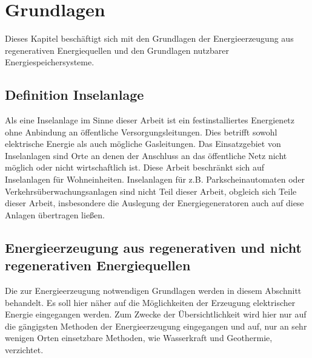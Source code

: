 \chapter{Grundlagen}
  Dieses Kapitel beschäftigt sich mit den Grundlagen der Energieerzeugung aus regenerativen Energiequellen und den Grundlagen nutzbarer Energiespeichersysteme.

  \section{Definition Inselanlage}
    Als eine Inselanlage im Sinne dieser Arbeit ist ein festinstalliertes Energienetz ohne Anbindung an öffentliche Versorgungsleitungen.
    Dies betrifft sowohl elektrische Energie als auch mögliche Gasleitungen.
    Das Einsatzgebiet von Inselanlagen sind Orte an denen der Anschluss an das öffentliche Netz nicht möglich oder nicht wirtschaftlich ist.
    Diese Arbeit beschränkt sich auf Inselanlagen für Wohneinheiten. Inselanlagen für z.B. Parkscheinautomaten oder Verkehrsüberwachungsanlagen sind nicht Teil dieser Arbeit, obgleich sich Teile dieser Arbeit, insbesondere die Auslegung der Energiegeneratoren auch auf diese Anlagen übertragen ließen.

  \section{Energieerzeugung aus regenerativen und nicht regenerativen Energiequellen}
    Die zur Energieerzeugung notwendigen Grundlagen werden in diesem Abschnitt behandelt.
    Es soll hier näher auf die Möglichkeiten der Erzeugung elektrischer Energie eingegangen werden.
    Zum Zwecke der Übersichtlichkeit wird hier nur auf die gängigsten Methoden der Energieerzeugung eingegangen und auf, nur an sehr wenigen Orten einsetzbare Methoden, wie Wasserkraft und Geothermie, verzichtet.

